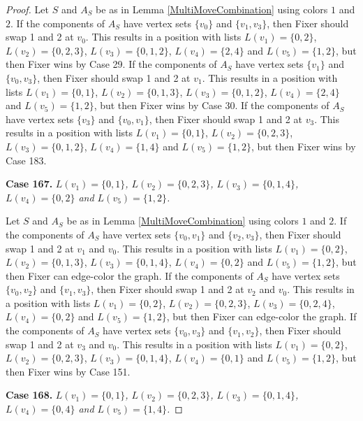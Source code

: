 \documentclass[12pt]{amsart}
\theoremstyle{plain}
\theoremstyle{definition}
\theoremstyle{remark}
\begin{document}
\begin{proof}
Let $S$ and $A_S$ be as in Lemma \ref{MultiMoveCombination} using colors $1$ and $2$. If the components of $A_S$ have vertex sets $\{v_0\}$ and $\{v_1, v_3\}$, then Fixer should swap 1 and 2 at $v_0$. This results in a position with lists $L(v_1) = \{0, 2\}$, $L(v_2) = \{0, 2, 3\}$, $L(v_3) = \{0, 1, 2\}$, $L(v_4) = \{2, 4\}$ and $L(v_5) = \{1, 2\}$, but then Fixer wins by Case 29.
If the components of $A_S$ have vertex sets $\{v_1\}$ and $\{v_0, v_3\}$, then Fixer should swap 1 and 2 at $v_1$. This results in a position with lists $L(v_1) = \{0, 1\}$, $L(v_2) = \{0, 1, 3\}$, $L(v_3) = \{0, 1, 2\}$, $L(v_4) = \{2, 4\}$ and $L(v_5) = \{1, 2\}$, but then Fixer wins by Case 30.
If the components of $A_S$ have vertex sets $\{v_3\}$ and $\{v_0, v_1\}$, then Fixer should swap 1 and 2 at $v_3$. This results in a position with lists $L(v_1) = \{0, 1\}$, $L(v_2) = \{0, 2, 3\}$, $L(v_3) = \{0, 1, 2\}$, $L(v_4) = \{1, 4\}$ and $L(v_5) = \{1, 2\}$, but then Fixer wins by Case 183.

\noindent\textbf{Case 167.  }\textit{$L(v_1) = \{0, 1\}$, $L(v_2) = \{0, 2, 3\}$, $L(v_3) = \{0, 1, 4\}$, $L(v_4) = \{0, 2\}$ and $L(v_5) = \{1, 2\}$.}

Let $S$ and $A_S$ be as in Lemma \ref{MultiMoveCombination} using colors $1$ and $2$. If the components of $A_S$ have vertex sets $\{v_0, v_1\}$ and $\{v_2, v_3\}$, then Fixer should swap 1 and 2 at $v_1$ and $v_0$. This results in a position with lists $L(v_1) = \{0, 2\}$, $L(v_2) = \{0, 1, 3\}$, $L(v_3) = \{0, 1, 4\}$, $L(v_4) = \{0, 2\}$ and $L(v_5) = \{1, 2\}$, but then Fixer can edge-color the graph.
If the components of $A_S$ have vertex sets $\{v_0, v_2\}$ and $\{v_1, v_3\}$, then Fixer should swap 1 and 2 at $v_2$ and $v_0$. This results in a position with lists $L(v_1) = \{0, 2\}$, $L(v_2) = \{0, 2, 3\}$, $L(v_3) = \{0, 2, 4\}$, $L(v_4) = \{0, 2\}$ and $L(v_5) = \{1, 2\}$, but then Fixer can edge-color the graph.
If the components of $A_S$ have vertex sets $\{v_0, v_3\}$ and $\{v_1, v_2\}$, then Fixer should swap 1 and 2 at $v_3$ and $v_0$. This results in a position with lists $L(v_1) = \{0, 2\}$, $L(v_2) = \{0, 2, 3\}$, $L(v_3) = \{0, 1, 4\}$, $L(v_4) = \{0, 1\}$ and $L(v_5) = \{1, 2\}$, but then Fixer wins by Case 151.

\noindent\textbf{Case 168.  }\textit{$L(v_1) = \{0, 1\}$, $L(v_2) = \{0, 2, 3\}$, $L(v_3) = \{0, 1, 4\}$, $L(v_4) = \{0, 4\}$ and $L(v_5) = \{1, 4\}$.}


\end{proof}
\end{document}
